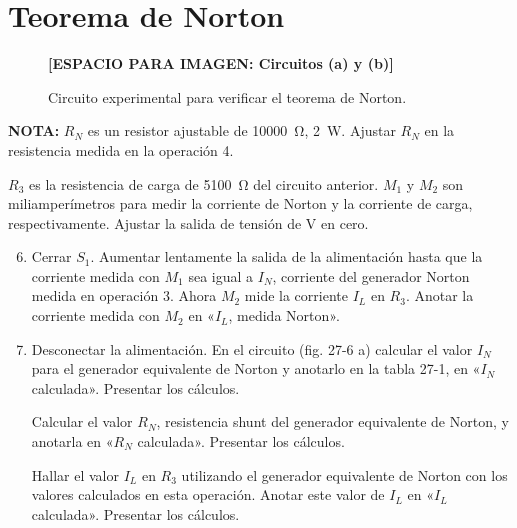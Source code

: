 
\section*{Teorema de Norton}
\pagestyle{empty} %

\begin{figure}[h!]
    \centering
    \vspace{5cm} %
    \textbf{[ESPACIO PARA IMAGEN: Circuitos (a) y (b)]}
    \caption{Circuito experimental para verificar el teorema de Norton.}
    \label{fig:circuito_experimental_norton}
\end{figure}

\noindent
\textbf{NOTA:} $R_N$ es un resistor ajustable de \SI{10000}{\ohm}, \SI{2}{\watt}. Ajustar $R_N$ en la resistencia medida en la operación 4.

\vspace{1em} %

\noindent
$R_3$ es la resistencia de carga de \SI{5100}{\ohm} del circuito anterior. $M_1$ y $M_2$ son miliamperímetros para medir la corriente de Norton y la corriente de carga, respectivamente. Ajustar la salida de tensión de V en cero.

\begin{enumerate}[resume, label=\arabic*.]
    \setcounter{enumi}{5} %
    \item Cerrar $S_1$. Aumentar lentamente la salida de la alimentación hasta que la corriente medida con $M_1$ sea igual a $I_N$, corriente del generador Norton medida en operación 3. Ahora $M_2$ mide la corriente $I_L$ en $R_3$. Anotar la corriente medida con $M_2$ en «$I_L$, medida Norton».

    \item Desconectar la alimentación. En el circuito (fig. 27-6 a) calcular el valor $I_N$ para el generador equivalente de Norton y anotarlo en la tabla 27-1, en «$I_N$ calculada». Presentar los cálculos.

    Calcular el valor $R_N$, resistencia shunt del generador equivalente de Norton, y anotarla en «$R_N$ calculada». Presentar los cálculos.

    Hallar el valor $I_L$ en $R_3$ utilizando el generador equivalente de Norton con los valores calculados en esta operación. Anotar este valor de $I_L$ en «$I_L$ calculada». Presentar los cálculos.
\end{enumerate}

